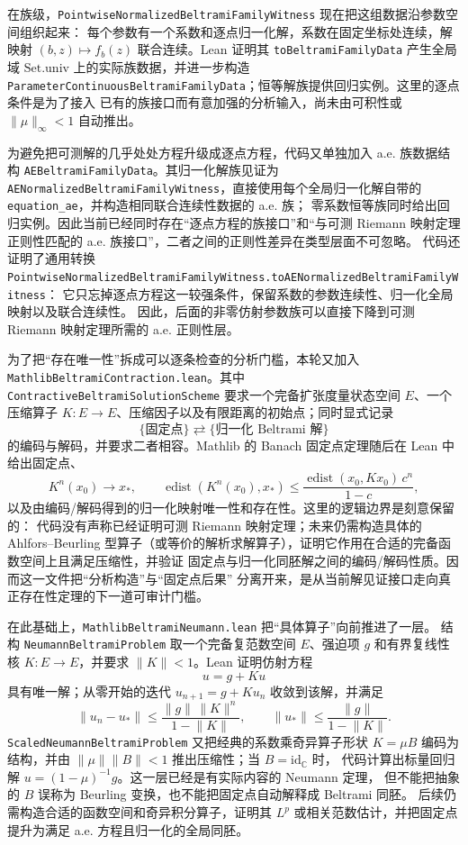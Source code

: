 \documentclass[UTF8,fontset=none,a4paper,11pt]{ctexart}
\begin{document}
在族级，\texttt{PointwiseNormalizedBeltramiFamilyWitness} 现在把这组数据沿参数空间组织起来：
每个参数有一个系数和逐点归一化解，系数在固定坐标处连续，解映射
\((b,z)\mapsto f_b(z)\) 联合连续。Lean 证明其
\texttt{toBeltramiFamilyData} 产生全局域 \(\mathrm{Set.univ}\) 上的实际族数据，并进一步构造
\texttt{ParameterContinuousBeltramiFamilyData}；恒等解族提供回归实例。这里的逐点条件是为了接入
已有的族接口而有意加强的分析输入，尚未由可积性或 \(\|\mu\|_\infty<1\) 自动推出。

为避免把可测解的几乎处处方程升级成逐点方程，代码又单独加入 a.e. 族数据结构
\texttt{AEBeltramiFamilyData}。其归一化解族见证为
\texttt{AENormalizedBeltramiFamilyWitness}，直接使用每个全局归一化解自带的
\texttt{equation\_ae}，并构造相同联合连续性数据的 a.e. 族；
零系数恒等族同时给出回归实例。因此当前已经同时存在“逐点方程的族接口”和“与可测 Riemann
映射定理正则性匹配的 a.e. 族接口”，二者之间的正则性差异在类型层面不可忽略。
代码还证明了通用转换
\texttt{PointwiseNormalizedBeltramiFamilyWitness.toAENormalizedBeltramiFamilyWitness}：
它只忘掉逐点方程这一较强条件，保留系数的参数连续性、归一化全局映射以及联合连续性。
因此，后面的非零仿射参数族可以直接下降到可测 Riemann 映射定理所需的 a.e. 正则性层。

为了把“存在唯一性”拆成可以逐条检查的分析门槛，本轮又加入
\texttt{MathlibBeltrami}\allowbreak\texttt{Contraction}\allowbreak\texttt{.lean}。其中
\texttt{ContractiveBeltrami}\allowbreak\texttt{SolutionScheme} 要求一个完备扩张度量状态空间
\(E\)、一个压缩算子 \(K:E\to E\)、压缩因子以及有限距离的初始点；同时显式记录
\[
\{\text{固定点}\}\rightleftarrows
\{\text{归一化 Beltrami 解}\}
\]
的编码与解码，并要求二者相容。Mathlib 的 Banach 固定点定理随后在 Lean 中给出固定点、
\[
K^n(x_0)\longrightarrow x_\ast,
\qquad
\operatorname{edist}(K^n(x_0),x_\ast)
\leq
\frac{\operatorname{edist}(x_0,Kx_0)\,c^n}{1-c},
\]
以及由编码/解码得到的归一化映射唯一性和存在性。这里的逻辑边界是刻意保留的：
代码没有声称已经证明可测 Riemann 映射定理；未来仍需构造具体的 Ahlfors--Beurling
型算子（或等价的解析求解算子），证明它作用在合适的完备函数空间上且满足压缩性，并验证
固定点与归一化同胚解之间的编码/解码性质。因而这一文件把“分析构造”与“固定点后果”
分离开来，是从当前解见证接口走向真正存在性定理的下一道可审计门槛。

在此基础上，\texttt{MathlibBeltramiNeumann}\allowbreak\texttt{.lean} 把“具体算子”向前推进了一层。
结构 \texttt{NeumannBeltramiProblem} 取一个完备复范数空间 \(E\)、强迫项 \(g\) 和有界复线性核
\(K:E\to E\)，并要求 \(\lVert K\rVert<1\)。Lean 证明仿射方程
\[
u=g+Ku
\]
具有唯一解；从零开始的迭代 \(u_{n+1}=g+Ku_n\) 收敛到该解，并满足
\[
\lVert u_n-u_\ast\rVert
\leq
\frac{\lVert g\rVert\,\lVert K\rVert^n}{1-\lVert K\rVert},
\qquad
\lVert u_\ast\rVert\leq
\frac{\lVert g\rVert}{1-\lVert K\rVert}.
\]
\texttt{ScaledNeumannBeltramiProblem} 又把经典的系数乘奇异算子形状
\(K=\mu B\) 编码为结构，并由
\(\lVert\mu\rVert\lVert B\rVert<1\) 推出压缩性；当 \(B=\mathrm{id}_{\mathbb C}\) 时，
代码计算出标量回归解 \(u=(1-\mu)^{-1}g\)。这一层已经是有实际内容的 Neumann 定理，
但不能把抽象的 \(B\) 误称为 Beurling 变换，也不能把固定点自动解释成 Beltrami 同胚。
后续仍需构造合适的函数空间和奇异积分算子，证明其 \(L^p\) 或相关范数估计，并把固定点
提升为满足 a.e. 方程且归一化的全局同胚。
\end{document}

